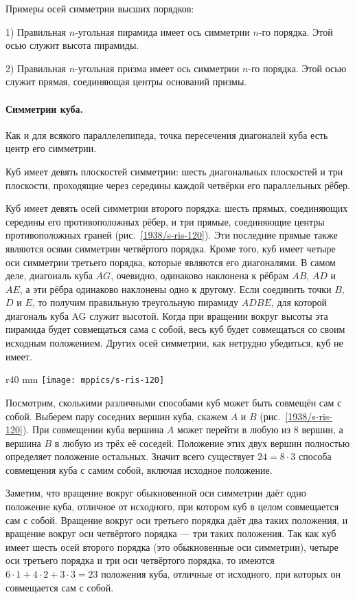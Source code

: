 Примеры осей симметрии высших порядков:

1) Правильная $n$-угольная пирамида имеет ось симметрии $n$-го порядка.
Этой осью служит высота пирамиды.

2) Правильная $n$-угольная призма имеет ось симметрии $n$-го порядка.
Этой осью служит прямая, соединяющая центры оснований призмы.

\paragraph{Симметрии куба.}\label{1938/s104}
Как и для всякого параллелепипеда, точка пересечения диагоналей куба есть центр его симметрии.

Куб имеет девять плоскостей симметрии: шесть диагональных плоскостей и три плоскости, проходящие через середины каждой четвёрки его параллельных рёбер.

Куб имеет девять осей симметрии второго порядка: шесть прямых, соединяющих середины его противоположных рёбер, и три прямые, соединяющие центры противоположных граней (рис.~\ref{1938/s-ris-120}).
Эти последние прямые также являются осями симметрии четвёртого порядка.
Кроме того, куб имеет четыре оси симметрии третьего порядка, которые являются его диагоналями.
В самом деле, диагональ куба $AG$, очевидно, одинаково наклонена к рёбрам $AB$, $AD$ и $AE$, а эти рёбра одинаково наклонены одно к другому.
Если соединить точки $B$, $D$ и $E$, то получим правильную треугольную пирамиду $ADBE$, для которой диагональ куба AG служит высотой.
Когда при вращении вокруг высоты эта пирамида будет совмещаться сама с собой, весь куб будет совмещаться со своим исходным положением.
Других осей симметрии, как нетрудно убедиться, куб не имеет.

\begin{wrapfigure}{r}{40 mm}
\vskip-0mm
\centering
\texttt{[image: mppics/s-ris-120]}
\caption{}\label{1938/s-ris-120}
\vskip-0mm
\end{wrapfigure}

Посмотрим, сколькими различными способами куб может быть совмещён сам с собой.
Выберем пару соседних вершин куба, скажем $A$ и $B$ (рис.~\ref{1938/s-ris-120}).
При совмещении куба вершина $A$ может перейти в любую из 8 вершин, 
а вершина $B$ в любую из трёх её соседей.
Положение этих двух вершин полностью определяет положение остальных.
Значит всего существует $24=8\cdot 3$  способа совмещения куба с самим собой, включая исходное положение.

Заметим, что вращение вокруг обыкновенной оси симметрии даёт одно положение куба, отличное от исходного, при котором куб в целом совмещается сам с собой.
Вращение вокруг оси третьего порядка даёт два таких положения, и вращение вокруг оси четвёртого порядка — три таких положения.
Так как куб имеет шесть осей второго порядка (это обыкновенные оси симметрии), четыре оси третьего порядка и три оси четвёртого порядка, то имеются $6\cdot 1 + 4\cdot 2 + 3\cdot 3 = 23$ положения куба, отличные от исходного, при которых он совмещается сам с собой. 

